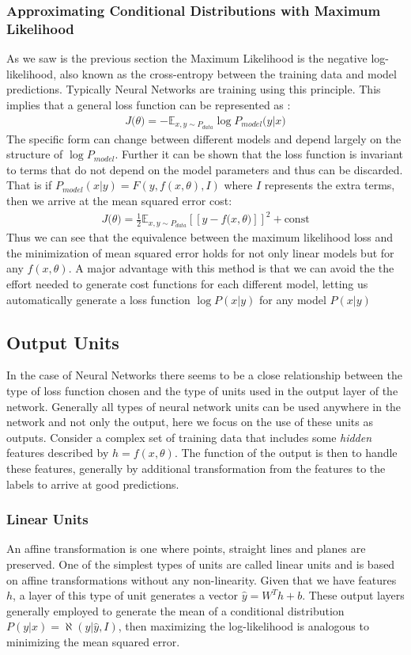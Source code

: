 \documentclass[14pt]{extarticle}
\numberwithin{equation}{section}
\begin{document}
	\subsubsection{Approximating Conditional Distributions with Maximum Likelihood}
	As we saw is the previous section the Maximum Likelihood is the negative log-likelihood, also known as the cross-entropy between the training data and model predictions. Typically Neural Networks are training using this principle. This implies that a general loss function can be represented as :
	\begin{align}
	J\big(\theta\big) = -\mathbb{E}_{x,{y \sim P_{data}}}\log P_{model}\big(y|x\big)
	\end{align}
	The specific form can change between different models and depend largely on the structure of $\log P_{model}$. Further it can be shown that the loss function is invariant to terms that do not depend on the model parameters and thus can be discarded. That is if $P_{model}(x | y) = F(y, f(x,\theta), I)$ where $I$ represents the extra terms, then we arrive at the mean squared error cost:
	\begin{align}
	J\big(\theta\big) = \frac{1}{2} \mathbb{E}_{x,{y \sim P_{data}}} [\![y - f\big(x, \theta\big)]\!]^2 + \text{const} \label{eq:mse_loss}
	\end{align}
	Thus we can see that the equivalence between the maximum likelihood loss and the minimization of mean squared error holds for not only linear models but for any $f(x,\theta)$. A major advantage with this method is that we can avoid the the effort needed to generate cost functions for each different model, letting us automatically generate a loss function $\log P(x | y)$ for any model $P(x | y)$
	\subsection{Output Units}
	In the case of Neural Networks there seems to be a close relationship between the type of loss function chosen and the type of units used in the output layer of the network. Generally all types of neural network units can be used anywhere in the network and not only the output, here we focus on the use of these units as outputs. Consider a complex set of training data that includes some \textit{hidden} features described by $h = f(x,\theta)$. The function of the output is then to handle these features, generally by additional transformation from the features to the labels to arrive at good predictions.
	\subsubsection{Linear Units}\label{linear_unit}
	An affine transformation is one where points, straight lines and planes are preserved. One of the simplest types of units are called linear units and is based on affine transformations without any non-linearity. Given that we have features $h$, a layer of this type of unit generates a vector $\hat{y} = W^T h + b$. These output layers generally employed to generate the mean of a conditional distribution $P(y | x) = \aleph(y | \hat{y}, I)$, then maximizing the log-likelihood is analogous to minimizing the mean squared error.
\end{document}
